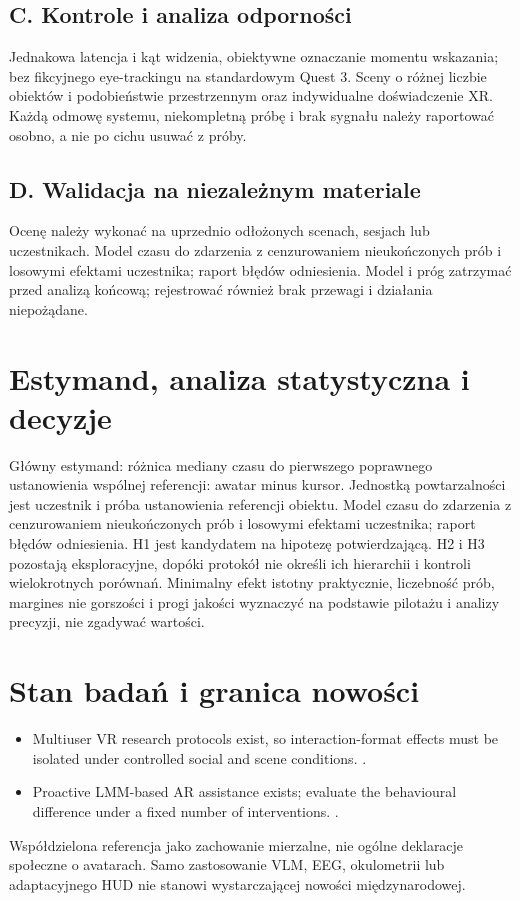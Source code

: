 \documentclass[11pt,a4paper]{article}
\begin{document}
\subsection{C. Kontrole i analiza odporności}
Jednakowa latencja i kąt widzenia, obiektywne oznaczanie momentu wskazania; bez fikcyjnego eye-trackingu na standardowym Quest 3. Sceny o różnej liczbie obiektów i podobieństwie przestrzennym oraz indywidualne doświadczenie XR. Każdą odmowę systemu, niekompletną próbę i brak sygnału należy raportować osobno, a nie po cichu usuwać z próby.

\subsection{D. Walidacja na niezależnym materiale}
Ocenę należy wykonać na uprzednio odłożonych scenach, sesjach lub uczestnikach. Model czasu do zdarzenia z cenzurowaniem nieukończonych prób i losowymi efektami uczestnika; raport błędów odniesienia. Model i próg zatrzymać przed analizą końcową; rejestrować również brak przewagi i działania niepożądane.

\section{Estymand, analiza statystyczna i decyzje}
Główny estymand: różnica mediany czasu do pierwszego poprawnego ustanowienia wspólnej referencji: awatar minus kursor. Jednostką powtarzalności jest uczestnik i próba ustanowienia referencji obiektu. Model czasu do zdarzenia z cenzurowaniem nieukończonych prób i losowymi efektami uczestnika; raport błędów odniesienia. H1 jest kandydatem na hipotezę potwierdzającą. H2 i H3 pozostają eksploracyjne, dopóki protokół nie określi ich hierarchii i kontroli wielokrotnych porównań. Minimalny efekt istotny praktycznie, liczebność prób, margines nie gorszości i progi jakości wyznaczyć na podstawie pilotażu i analizy precyzji, nie zgadywać wartości.

\section{Stan badań i granica nowości}
\begin{itemize}
\item Multiuser VR research protocols exist, so interaction-format effects must be isolated under controlled social and scene conditions. \cite{xrprior1}.
\item Proactive LMM-based AR assistance exists; evaluate the behavioural difference under a fixed number of interventions. \cite{xrprior2}.
\end{itemize}
Współdzielona referencja jako zachowanie mierzalne, nie ogólne deklaracje społeczne o avatarach. Samo zastosowanie VLM, EEG, okulometrii lub adaptacyjnego HUD nie stanowi wystarczającej nowości międzynarodowej.
\end{document}
